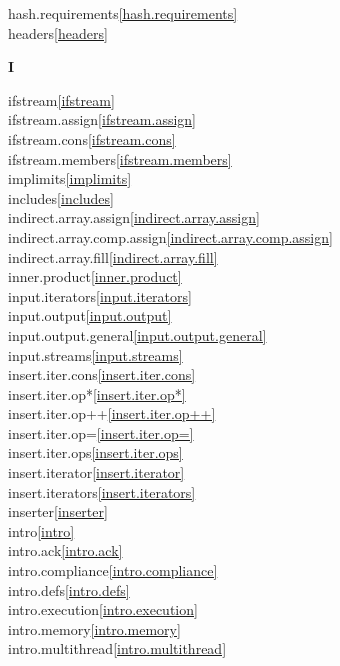 \begin{multicols}{2}
hash.requirements\quad\ref{hash.requirements}\\
headers\quad\ref{headers}\\
\par \textbf{I}\par
ifstream\quad\ref{ifstream}\\
ifstream.assign\quad\ref{ifstream.assign}\\
ifstream.cons\quad\ref{ifstream.cons}\\
ifstream.members\quad\ref{ifstream.members}\\
implimits\quad\ref{implimits}\\
includes\quad\ref{includes}\\
indirect.array.assign\quad\ref{indirect.array.assign}\\
indirect.array.comp.assign\quad\ref{indirect.array.comp.assign}\\
indirect.array.fill\quad\ref{indirect.array.fill}\\
inner.product\quad\ref{inner.product}\\
input.iterators\quad\ref{input.iterators}\\
input.output\quad\ref{input.output}\\
input.output.general\quad\ref{input.output.general}\\
input.streams\quad\ref{input.streams}\\
insert.iter.cons\quad\ref{insert.iter.cons}\\
insert.iter.op*\quad\ref{insert.iter.op*}\\
insert.iter.op++\quad\ref{insert.iter.op++}\\
insert.iter.op=\quad\ref{insert.iter.op=}\\
insert.iter.ops\quad\ref{insert.iter.ops}\\
insert.iterator\quad\ref{insert.iterator}\\
insert.iterators\quad\ref{insert.iterators}\\
inserter\quad\ref{inserter}\\
intro\quad\ref{intro}\\
intro.ack\quad\ref{intro.ack}\\
intro.compliance\quad\ref{intro.compliance}\\
intro.defs\quad\ref{intro.defs}\\
intro.execution\quad\ref{intro.execution}\\
intro.memory\quad\ref{intro.memory}\\
intro.multithread\quad\ref{intro.multithread}\\

\end{multicols}
